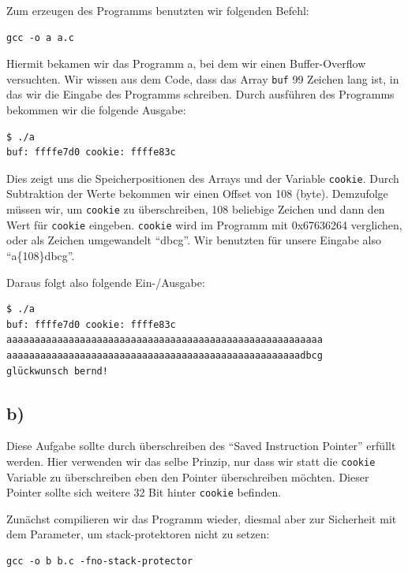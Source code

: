 \documentclass[10pt,a4paper]{article}
\begin{document}
Zum erzeugen des Programms benutzten wir folgenden Befehl:
\begin{verbatim}
gcc -o a a.c
\end{verbatim}

Hiermit bekamen wir das Programm a, bei dem wir einen Buffer-Overflow versuchten. Wir wissen aus dem Code, dass das Array \texttt{buf} 99 Zeichen lang ist, in das wir die Eingabe des Programms schreiben. Durch ausführen des Programms bekommen wir die folgende Ausgabe:
\begin{verbatim}
$ ./a
buf: ffffe7d0 cookie: ffffe83c
\end{verbatim}

Dies zeigt uns die Speicherpositionen des Arrays und der Variable \texttt{cookie}. Durch Subtraktion der Werte bekommen wir einen Offset von 108 (byte). Demzufolge müssen wir, um \texttt{cookie} zu überschreiben, 108 beliebige Zeichen und dann den Wert für \texttt{cookie} eingeben. \texttt{cookie} wird im Programm mit 0x67636264 verglichen, oder als Zeichen umgewandelt "`dbcg"'. Wir benutzten für unsere Eingabe also "`a\{108\}dbcg"'.

Daraus folgt also folgende Ein-/Ausgabe:
\begin{verbatim}
$ ./a
buf: ffffe7d0 cookie: ffffe83c
aaaaaaaaaaaaaaaaaaaaaaaaaaaaaaaaaaaaaaaaaaaaaaaaaaaaaaaa
aaaaaaaaaaaaaaaaaaaaaaaaaaaaaaaaaaaaaaaaaaaaaaaaaaaadbcg
glückwunsch bernd!
\end{verbatim}

\subsection*{b)}

Diese Aufgabe sollte durch überschreiben des "`Saved Instruction Pointer"' erfüllt werden. Hier verwenden wir das selbe Prinzip, nur dass wir statt die \texttt{cookie} Variable zu überschreiben eben den Pointer überschreiben möchten. Dieser Pointer sollte sich weitere 32 Bit hinter \texttt{cookie} befinden.

Zunächst compilieren wir das Programm wieder, diesmal aber zur Sicherheit mit dem Parameter, um stack-protektoren nicht zu setzen:
\begin{verbatim}
gcc -o b b.c -fno-stack-protector
\end{verbatim}
\end{document}
